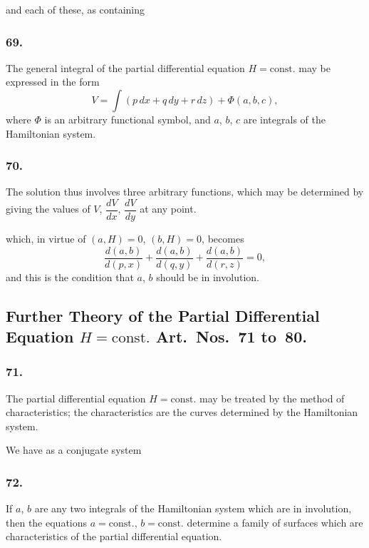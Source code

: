 \documentclass[12pt,a4paper]{article}
\theoremstyle{plain}
\begin{document}
\newpage
\setcounter{page}{144}

and each of these, as containing

\subsubsection*{69.}

The general integral of the partial differential equation $H = \text{const.}$ may be expressed in the form
\[
V = \int(p\,dx + q\,dy + r\,dz) + \Phi(a, b, c),
\]
where $\Phi$ is an arbitrary functional symbol, and $a$, $b$, $c$ are integrals of the Hamiltonian system.

\subsubsection*{70.}

The solution thus involves three arbitrary functions, which may be determined by giving the values of $V$, $\dfrac{dV}{dx}$, $\dfrac{dV}{dy}$ at any point.

\newpage
\setcounter{page}{145}

which, in virtue of $(a, H) = 0$, $(b, H) = 0$, becomes
\[
\frac{d(a, b)}{d(p, x)} + \frac{d(a, b)}{d(q, y)} + \frac{d(a, b)}{d(r, z)} = 0,
\]
and this is the condition that $a$, $b$ should be in involution.

\subsection*{Further Theory of the Partial Differential Equation $H = \text{const.}$ Art.~Nos.~71 to~80.}

\subsubsection*{71.}

The partial differential equation $H = \text{const.}$ may be treated by the method of characteristics; the characteristics are the curves determined by the Hamiltonian system.

\newpage
\setcounter{page}{146}

We have as a conjugate system

\subsubsection*{72.}

If $a$, $b$ are any two integrals of the Hamiltonian system which are in involution, then the equations $a = \text{const.}$, $b = \text{const.}$ determine a family of surfaces which are characteristics of the partial differential equation.
\end{document}
